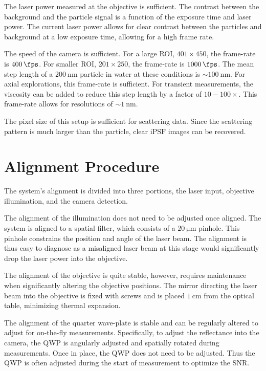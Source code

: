 The laser power measured at the objective is sufficient. The contrast between the background and the particle signal is a function of the exposure time and laser power. The current laser power allows for clear contrast between the particles and background at a low exposure time, allowing for a high frame rate.

The speed of the camera is sufficient. For a large ROI, $401 \times 450$, the frame-rate is $\SI{400}{\fps}$. For smaller ROI, $201 \times 250$, the frame-rate is $\SI{1000}{\fps}$. The mean step length of a $\SI{200}{\nm}$ particle in water at these conditions is $\sim \SI{100}{\nm}$. For axial explorations, this frame-rate is sufficient. For transient measurements, the viscosity can be added to reduce this step length by a factor of $10-100 \times$. This frame-rate allows for resolutions of $\sim \SI{1}{\nm}$.

The pixel size of this setup is sufficient for scattering data. Since the scattering pattern is much larger than the particle, clear $\mathrm{iPSF}$ images can be recovered. 

\section{Alignment Procedure}

The system's alignment is divided into three portions, the laser input, objective illumination, and the camera detection. 

The alignment of the illumination does not need to be adjusted once aligned. The system is aligned to a spatial filter, which consists of a $\SI{20}{\micro\meter}$ pinhole. This pinhole constrains the position and angle of the laser beam. The alignment is thus easy to diagnose as a misaligned laser beam at this stage would significantly drop the laser power into the objective.

The alignment of the objective is quite stable, however, requires maintenance when significantly altering the objective positions. The mirror directing the laser beam into the objective is fixed with screws and is placed $\SI{1}{\cm}$ from the optical table, minimizing thermal expansion. 

The alignment of the quarter wave-plate is stable and can be regularly altered to adjust for on-the-fly measurements. Specifically, to adjust the reflectance into the camera, the QWP is angularly adjusted and spatially rotated during measurements. Once in place, the QWP does not need to be adjusted. Thus the QWP is often adjusted during the start of measurement to optimize the SNR. 

